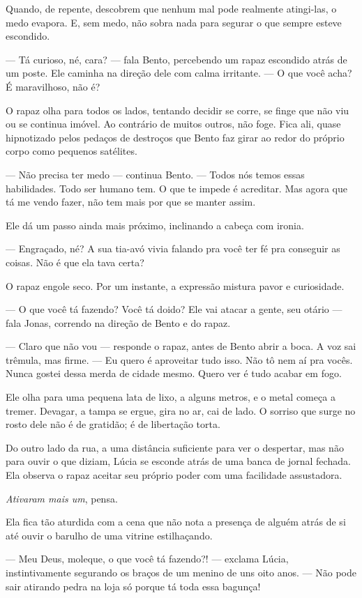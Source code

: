Quando, de repente, descobrem que nenhum mal pode realmente atingi-las, o medo evapora.  
E, sem medo, não sobra nada para segurar o que sempre esteve escondido.

— Tá curioso, né, cara? — fala Bento, percebendo um rapaz escondido atrás de um poste. Ele caminha na direção dele com calma irritante. — O que você acha? É maravilhoso, não é?

O rapaz olha para todos os lados, tentando decidir se corre, se finge que não viu ou se continua imóvel.  
Ao contrário de muitos outros, não foge.  
Fica ali, quase hipnotizado pelos pedaços de destroços que Bento faz girar ao redor do próprio corpo como pequenos satélites.

— Não precisa ter medo — continua Bento. — Todos nós temos essas habilidades. Todo ser humano tem. O que te impede é acreditar.  
Mas agora que tá me vendo fazer, não tem mais por que se manter assim.

Ele dá um passo ainda mais próximo, inclinando a cabeça com ironia.

— Engraçado, né? A sua tia-avó vivia falando pra você ter fé pra conseguir as coisas. Não é que ela tava certa?

O rapaz engole seco.  
Por um instante, a expressão mistura pavor e curiosidade.

— O que você tá fazendo? Você tá doido? Ele vai atacar a gente, seu otário — fala Jonas, correndo na direção de Bento e do rapaz.

— Claro que não vou — responde o rapaz, antes de Bento abrir a boca. A voz sai trêmula, mas firme. — Eu quero é aproveitar tudo isso. Não tô nem aí pra vocês. Nunca gostei dessa merda de cidade mesmo.  
Quero ver é tudo acabar em fogo.

Ele olha para uma pequena lata de lixo, a alguns metros, e o metal começa a tremer.  
Devagar, a tampa se ergue, gira no ar, cai de lado.  
O sorriso que surge no rosto dele não é de gratidão; é de libertação torta.

Do outro lado da rua, a uma distância suficiente para ver o despertar, mas não para ouvir o que diziam, Lúcia se esconde atrás de uma banca de jornal fechada.
Ela observa o rapaz aceitar seu próprio poder com uma facilidade assustadora.

\emph{Ativaram mais um}, pensa.

Ela fica tão aturdida com a cena que não nota a presença de alguém atrás de si até ouvir o barulho de uma vitrine estilhaçando.

— Meu Deus, moleque, o que você tá fazendo?! — exclama Lúcia, instintivamente segurando os braços de um menino de uns oito anos. — Não pode sair atirando pedra na loja só porque tá toda essa bagunça!


